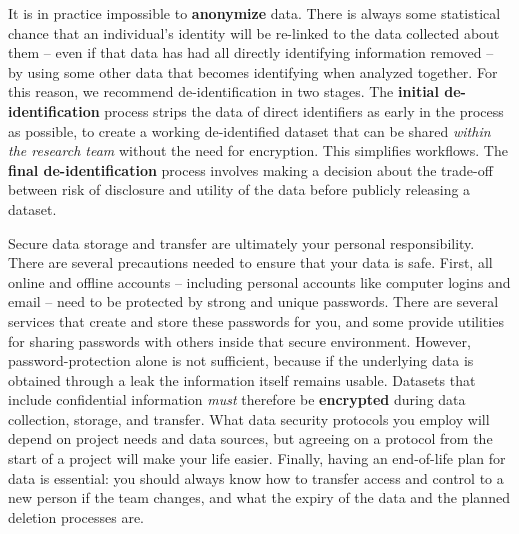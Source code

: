 It is in practice impossible to \textbf{anonymize} data.
There is always some statistical chance that an individual's identity
will be re-linked to the data collected about them
-- even if that data has had all directly identifying information removed --
by using some other data that becomes identifying when analyzed together.
For this reason, we recommend de-identification in two stages.
The \textbf{initial de-identification} process strips the data of direct identifiers
as early in the process as possible,
to create a working de-identified dataset that
can be shared \textit{within the research team} without the need for encryption.
This simplifies workflows.
The \textbf{final de-identification} process involves
making a decision about the trade-off between
risk of disclosure and utility of the data
before publicly releasing a dataset.

Secure data storage and transfer are ultimately your personal responsibility.
There are several precautions needed to ensure that your data is safe.
First, all online and offline accounts
-- including personal accounts like computer logins and email --
need to be protected by strong and unique passwords.
There are several services that create and store these passwords for you,
and some provide utilities for sharing passwords with others
inside that secure environment.
However, password-protection alone is not sufficient,
because if the underlying data is obtained through a leak the information itself remains usable.
Datasets that include confidential information
\textit{must} therefore be \textbf{encrypted}
during data collection, storage, and transfer.
What data security protocols you employ will depend on project needs and data sources,
but agreeing on a protocol from the start of a project will make your life easier.
Finally, having an end-of-life plan for data is essential:
you should always know how to transfer access and control to a new person if the team changes,
and what the expiry of the data and the planned deletion processes are.
